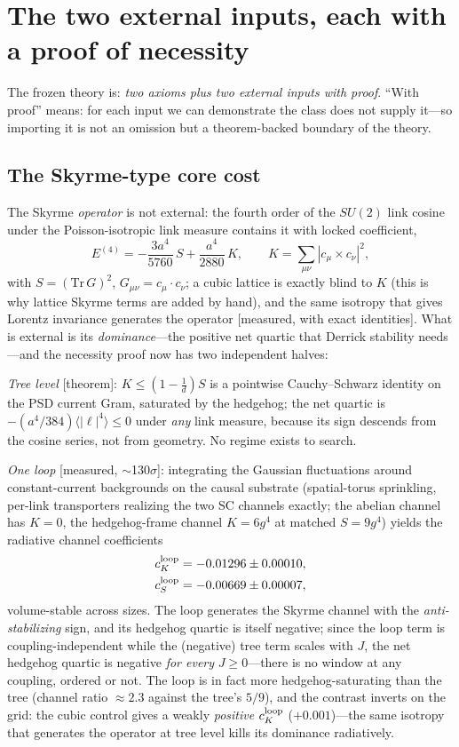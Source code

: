 \documentclass[aps,prd,reprint,nofootinbib,superscriptaddress,floatfix]{revtex4-2}
\theoremstyle{definition}
\begin{document}
\section{The two external inputs, each with a proof of necessity}
\label{sec:externals}

The frozen theory is: \emph{two axioms plus two external inputs with proof}. ``With
proof'' means: for each input we can demonstrate the class does not supply it---so
importing it is not an omission but a theorem-backed boundary of the theory.

\subsection{The Skyrme-type core cost}
\label{sec:skyrme}

The Skyrme \emph{operator} is not external: the fourth order of the $SU(2)$ link cosine
under the Poisson-isotropic link measure contains it with locked coefficient,
\begin{equation}
E^{(4)}=-\frac{3a^4}{5760}\,S+\frac{a^4}{2880}\,K,\qquad
K=\sum_{\mu\nu}|c_\mu\times c_\nu|^2,
\end{equation}
with $S=(\mathrm{Tr}\,G)^2$, $G_{\mu\nu}=c_\mu\!\cdot\!c_\nu$; a cubic lattice is exactly
blind to $K$ (this is why lattice Skyrme terms are added by hand), and the same isotropy
that gives Lorentz invariance generates the operator [measured, with exact identities].
What is external is its \emph{dominance}---the positive net quartic that Derrick
stability needs---and the necessity proof now has two independent halves:

\emph{Tree level} [theorem]: $K\le(1-\tfrac1d)S$ is a pointwise Cauchy--Schwarz identity
on the PSD current Gram, saturated by the hedgehog; the net quartic is
$-(a^4/384)\langle|\ell|^4\rangle\le0$ under \emph{any} link measure, because its sign
descends from the cosine series, not from geometry. No regime exists to search.

\emph{One loop} [measured, $\sim$130$\sigma$]: integrating the Gaussian fluctuations
around constant-current backgrounds on the causal substrate (spatial-torus sprinkling,
per-link transporters realizing the two SC channels exactly; the abelian channel has
$K=0$, the hedgehog-frame channel $K=6g^4$ at matched $S=9g^4$) yields the radiative
channel coefficients
\begin{align}
c_K^{\rm loop}&=-0.01296\pm0.00010,\nonumber\\
c_S^{\rm loop}&=-0.00669\pm0.00007,
\end{align}
volume-stable across sizes. The loop generates the Skyrme channel with the
\emph{anti-stabilizing} sign, and its hedgehog quartic is itself negative; since the
loop term is coupling-independent while the (negative) tree term scales with $J$, the
net hedgehog quartic is negative \emph{for every} $J\ge0$---there is no window at any
coupling, ordered or not. The loop is in fact more hedgehog-saturating than the tree
(channel ratio $\approx2.3$ against the tree's $5/9$), and the contrast inverts on the
grid: the cubic control gives a weakly \emph{positive} $c_K^{\rm loop}$
($+0.001$)---the same isotropy that generates the operator at tree level kills its
dominance radiatively.
\end{document}

